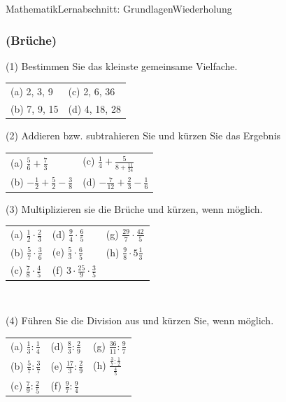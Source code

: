 \documentclass[11pt,twocolumn,oneside,openany,headings=optiontotoc,11pt,numbers=noenddot]{article}
\begin{document}
\begin{worksheet}{Mathematik}{Lernabschnitt: Grundlagen}{Wiederholung}
		\subsubsection*{(Brüche)}
		(1) Bestimmen Sie das kleinste gemeinsame Vielfache.\\
		\begin{tabularx}{0.5\textwidth}{XX}
			(a) 2, 3, 9 & (c) 2, 6, 36\\
			(b) 7, 9, 15 & (d) 4, 18, 28
		\end{tabularx}
		\par\bigskip\noindent
		(2) Addieren bzw. subtrahieren Sie und kürzen Sie das Ergebnis
		\begin{tabularx}{0.5\textwidth}{XX}
			(a) \(\frac{5}{6} + \frac{7}{3}\) & (c) \(\frac{1}{4} + \frac{5}{8 + \frac{11}{24}}\)\\
			(b) \(-\frac{1}{2}+\frac{5}{2}-\frac{3}{8}\) & (d) \(-\frac{7}{12} + \frac{2}{3} - \frac{1}{6}\)
		\end{tabularx}
		\par\bigskip\noindent
		(3) Multiplizieren sie die Brüche und kürzen, wenn möglich.
		\begin{tabularx}{0.5\textwidth}{XXX}
			(a) \(\frac{1}{2}\cdot\frac{2}{3}\) & (d) \(\frac{9}{4}\cdot\frac{6}{5}\) & (g) \(\frac{29}{7}\cdot\frac{42}{5}\)\\
			(b) \(\frac{5}{7}\cdot\frac{3}{6}\) & (e) \(\frac{5}{3}\cdot\frac{6}{5}\) & (h) \(\frac{9}{8}\cdot{}5\frac{1}{3}\)\\
			(c) \(\frac{7}{8}\cdot\frac{4}{5}\) & (f) \(3\cdot\frac{25}{9}\cdot\frac{3}{5}\)
		\end{tabularx}\\
		\par\bigskip\noindent
		(4) Führen Sie die Division aus und kürzen Sie, wenn möglich.
		\begin{tabularx}{0.5\textwidth}{XXX}
			(a) \(\frac{1}{3}:\frac{1}{4}\) & (d) \(\frac{8}{3}:\frac{2}{9}\) & (g) \(\frac{36}{11}:\frac{9}{7}\)\\
			(b) \(\frac{5}{7}:\frac{3}{7}\) & (e) \(\frac{17}{3}:\frac{2}{9}\) & (h) \(\frac{\frac{3}{7}:\frac{1}{2}}{\frac{4}{5}}\)\\
			(c) \(\frac{7}{9}:\frac{2}{5}\) & (f) \(\frac{9}{7}:\frac{9}{4}\)
		\end{tabularx}\\

\end{worksheet}
\end{document}
